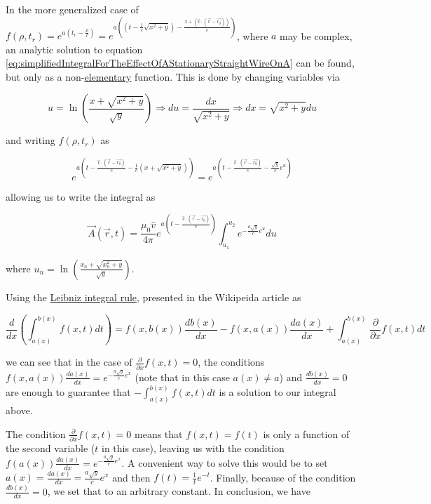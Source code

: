 ﻿\documentclass{article}
\begin{document}
In the more generalized case of $f(\rho, t_r) = e^{a(t_r - \frac{\rho}{c})} = e^{a((t - \frac{1}{c} \sqrt{x^2 + y}) - \frac{x + (\hat{v} \cdot (\vec{r} - \vec{r_0}))}{c})}$, where $a$ may be complex, an analytic solution to equation \ref{eq:simplifiedIntegralForTheEffectOfAStationaryStraightWireOnA} can be found, but only as a non-\href{https://en.wikipedia.org/wiki/Elementary_function}{elementary} function. This is done by changing variables via

\begin{equation*}
    u = \ln \left( \frac{x + \sqrt{x^2 + y}}{\sqrt{y}} \right) \Rightarrow du = \frac{dx}{\sqrt{x^2 + y}} \Rightarrow dx = \sqrt{x^2 + y} du
\end{equation*}

and writing $f(\rho, t_r)$ as

\begin{equation*}
    e^{a(t - \frac{\hat{v} \cdot (\vec{r} - \vec{r_0})}{c} - \frac{1}{c} (x + \sqrt{x^2 + y}))} = e^{a(t - \frac{\hat{v} \cdot (\vec{r} - \vec{r_0})}{c} - \frac{\sqrt{y}}{c} e^u)}
\end{equation*}

allowing us to write the integral as

\begin{equation*}
   \vec{A}(\vec{r}, t) = \frac{\mu_0 \hat{v}}{4 \pi} e^{a(t - \frac{\hat{v} \cdot (\vec{r} - \vec{r_0})}{c})} \int_{u_1}^{u_2} e^{- \frac{a \sqrt{y}}{c} e^u} du
\end{equation*}

where $u_n = \ln \left( \frac{x_n + \sqrt{x_n^2 + y}}{\sqrt{y}} \right)$.

Using the \href{https://en.wikipedia.org/wiki/Leibniz_integral_rule}{Leibniz integral rule}, presented in the Wikipeida article as

\begin{equation*}
    \frac{d}{dx} \left( \int_{a(x)}^{b(x)} f(x, t) dt \right) = f(x, b(x)) \frac{db(x)}{dx} - f(x, a(x)) \frac{da(x)}{dx} + \int_{a(x)}^{b(x)} \frac{\partial}{\partial x} f(x, t) dt
\end{equation*}

we can see that in the case of $\frac{\partial}{\partial x} f(x, t) = 0$, the conditions $f(x, a(x)) \frac{da(x)}{dx} = e^{- \frac{a \sqrt{y}}{c} e^x}$ (note that in this case $a(x) \neq a$) and $\frac{db(x)}{dx} = 0$ are enough to guarantee that $- \int_{a(x)}^{b(x)} f(x, t) dt$ is a solution to our integral above.

The condition $\frac{\partial}{\partial x} f(x, t) = 0$ means that $f(x, t) = f(t)$ is only a function of the second variable ($t$ in this case), leaving us with the condition $f(a(x)) \frac{da(x)}{dx} = e^{- \frac{a \sqrt{y}}{c} e^x}$. A convenient way to solve this would be to set $a(x) = \frac{da(x)}{dx} = \frac{a \sqrt{y}}{c} e^x$ and then $f(t) = \frac{1}{t} e^{- t}$. Finally, because of the condition $\frac{db(x)}{dx} = 0$, we set that to an arbitrary constant. In conclusion, we have
\end{document}
